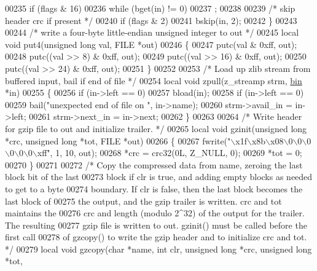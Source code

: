 \begin{DoxyCode}
{00235     \textcolor{keywordflow}{if} (flags & 16)
00236         \textcolor{keywordflow}{while} (bget(in) != 0)
00237             ;
00238 
00239     \textcolor{comment}{/* skip header crc if present */}
00240     \textcolor{keywordflow}{if} (flags & 2)
00241         bskip(in, 2);
00242 \}
00243 
00244 \textcolor{comment}{/* write a four-byte little-endian unsigned integer to out */}
00245 local \textcolor{keywordtype}{void} put4(\textcolor{keywordtype}{unsigned} \textcolor{keywordtype}{long} val, FILE *out)
00246 \{
00247     putc(val & 0xff, out);
00248     putc((val >> 8) & 0xff, out);
00249     putc((val >> 16) & 0xff, out);
00250     putc((val >> 24) & 0xff, out);
00251 \}
00252 
00253 \textcolor{comment}{/* Load up zlib stream from buffered input, bail if end of file */}
00254 local \textcolor{keywordtype}{void} zpull(z\_streamp strm, \hyperlink{structbin}{bin} *in)
00255 \{
00256     \textcolor{keywordflow}{if} (in->left == 0)
00257         bload(in);
00258     \textcolor{keywordflow}{if} (in->left == 0)
00259         bail(\textcolor{stringliteral}{"unexpected end of file on "}, in->name);
00260     strm->avail\_in = in->left;
00261     strm->next\_in = in->next;
00262 \}
00263 
00264 \textcolor{comment}{/* Write header for gzip file to out and initialize trailer. */}
00265 local \textcolor{keywordtype}{void} gzinit(\textcolor{keywordtype}{unsigned} \textcolor{keywordtype}{long} *crc, \textcolor{keywordtype}{unsigned} \textcolor{keywordtype}{long} *tot, FILE *out)
00266 \{
00267     fwrite(\textcolor{stringliteral}{"\(\backslash\)x1f\(\backslash\)x8b\(\backslash\)x08\(\backslash\)0\(\backslash\)0\(\backslash\)0\(\backslash\)0\(\backslash\)0\(\backslash\)0\(\backslash\)xff"}, 1, 10, out);
00268     *crc = crc32(0L, Z\_NULL, 0);
00269     *tot = 0;
00270 \}
00271 
00272 \textcolor{comment}{/* Copy the compressed data from name, zeroing the last block bit of the last}
00273 \textcolor{comment}{   block if clr is true, and adding empty blocks as needed to get to a byte}
00274 \textcolor{comment}{   boundary.  If clr is false, then the last block becomes the last block of}
00275 \textcolor{comment}{   the output, and the gzip trailer is written.  crc and tot maintains the}
00276 \textcolor{comment}{   crc and length (modulo 2^32) of the output for the trailer.  The resulting}
00277 \textcolor{comment}{   gzip file is written to out.  gzinit() must be called before the first call}
00278 \textcolor{comment}{   of gzcopy() to write the gzip header and to initialize crc and tot. */}
00279 local \textcolor{keywordtype}{void} gzcopy(\textcolor{keywordtype}{char} *name, \textcolor{keywordtype}{int} clr, \textcolor{keywordtype}{unsigned} \textcolor{keywordtype}{long} *crc, \textcolor{keywordtype}{unsigned} \textcolor{keywordtype}{long} *tot,
}
\end{DoxyCode}
